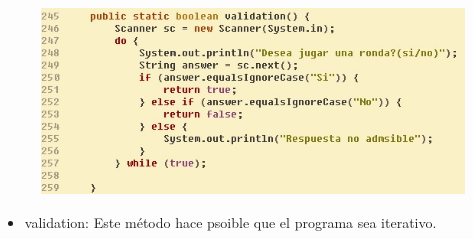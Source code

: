 \documentclass{article}
\begin{document}
	\begin{figure}[H]
		\centering
		\includegraphics[width=1\textwidth,keepaspectratio]{img/validation.jpg}
	\end{figure}
	
	
	\begin{itemize}	
		\item validation: Este método hace psoible que el programa sea iterativo.
	\end{itemize}
	
\end{document}
